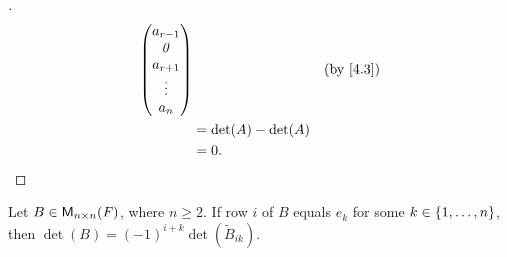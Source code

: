 \begin{proof}[]
\begin{align*}
\begin{pmatrix}
                                          a_{r - 1} \\
                                          \zv       \\
                                          a_{r + 1} \\
                                          \vdots    \\
                                          a_n
                                        \end{pmatrix} &  & \text{(by \cref{4.3})} \\
            & = \det(A) - \det(A)                                                 \\
            & = 0.
  \end{align*}
\end{proof}

\begin{lem}\label{4.2.5}
  Let \(B \in \mathsf{M}_{{n} \times n}({\mathit{F}})\), where \(n \geq 2\).
  If row \(i\) of \(B\) equals \(e_k\) for some \(k \in \left\lbrace1, \dots, n\right\rbrace\), then \(\det(B) = (-1)^{i + k} \det(\tilde{B}_{i k})\).
\end{lem}

